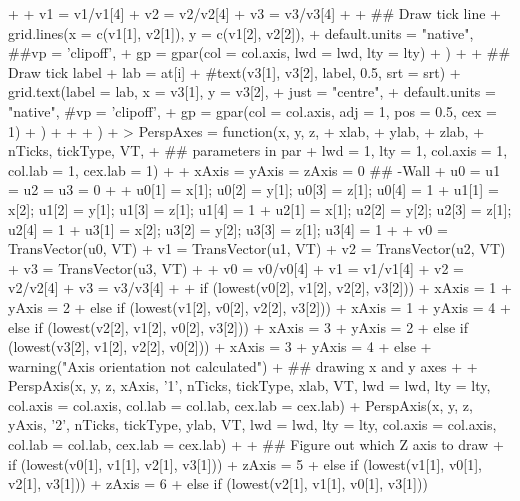 \documentclass[paper=a4, fontsize=11pt]{report}
\begin{document}
\begin{Schunk}
\begin{Sinput}
{{{+                         
+             v1 = v1/v1[4]
+             v2 = v2/v2[4]
+             v3 = v3/v3[4]
+             
+             ## Draw tick line
+             grid.lines(x = c(v1[1], v2[1]), y = c(v1[2], v2[2]),
+                 default.units = "native", ##vp = 'clipoff',
+                 gp = gpar(col = col.axis, lwd = lwd, lty = lty)
+                 )
+ 
+             ## Draw tick label
+             lab = at[i]
+             #text(v3[1], v3[2], label, 0.5, srt = srt)
+             grid.text(label = lab, x = v3[1], y = v3[2],
+                   just = "centre",
+                   default.units = "native", #vp = 'clipoff',
+                   gp = gpar(col = col.axis, adj = 1, pos = 0.5, cex = 1)
+                   )
+             }
+         }
+     )
+ }
> PerspAxes = function(x, y, z, 
+                     xlab, 
+                     ylab, 
+                     zlab, 
+                     nTicks, tickType, VT, 
+ 					## parameters in par
+                     lwd = 1, lty = 1, col.axis = 1, col.lab = 1, cex.lab = 1)
+ {
+     xAxis = yAxis = zAxis = 0 ## -Wall 
+     u0 = u1 = u2 = u3 = 0
+ 
+     u0[1] = x[1]; u0[2] = y[1]; u0[3] = z[1]; u0[4] = 1
+     u1[1] = x[2]; u1[2] = y[1]; u1[3] = z[1]; u1[4] = 1
+     u2[1] = x[1]; u2[2] = y[2]; u2[3] = z[1]; u2[4] = 1
+     u3[1] = x[2]; u3[2] = y[2]; u3[3] = z[1]; u3[4] = 1
+ 
+     v0 = TransVector(u0, VT)
+     v1 = TransVector(u1, VT)
+     v2 = TransVector(u2, VT)
+     v3 = TransVector(u3, VT)
+ 
+     v0 = v0/v0[4]
+     v1 = v1/v1[4]
+     v2 = v2/v2[4]
+     v3 = v3/v3[4]
+ 
+     if (lowest(v0[2], v1[2], v2[2], v3[2])) {
+         xAxis = 1
+         yAxis = 2
+     } else if (lowest(v1[2], v0[2], v2[2], v3[2])) {
+         xAxis = 1
+         yAxis = 4
+     } else if (lowest(v2[2], v1[2], v0[2], v3[2])) {
+         xAxis = 3
+         yAxis = 2
+     } else if (lowest(v3[2], v1[2], v2[2], v0[2])) {
+         xAxis = 3
+         yAxis = 4
+     } else
+         warning("Axis orientation not calculated")
+     ## drawing x and y axes
+     
+     PerspAxis(x, y, z, xAxis, '1', nTicks, tickType, xlab, VT, lwd = lwd, lty = lty, col.axis = col.axis, col.lab = col.lab, cex.lab = cex.lab)
+     PerspAxis(x, y, z, yAxis, '2', nTicks, tickType, ylab, VT, lwd = lwd, lty = lty, col.axis = col.axis, col.lab = col.lab, cex.lab = cex.lab)
+ 
+     ## Figure out which Z axis to draw
+     if (lowest(v0[1], v1[1], v2[1], v3[1])) {
+             zAxis = 5
+         }else if (lowest(v1[1], v0[1], v2[1], v3[1])) {
+             zAxis = 6
+         }else if (lowest(v2[1], v1[1], v0[1], v3[1])) {
}}
\end{Sinput}
\end{Schunk}
\end{document}

